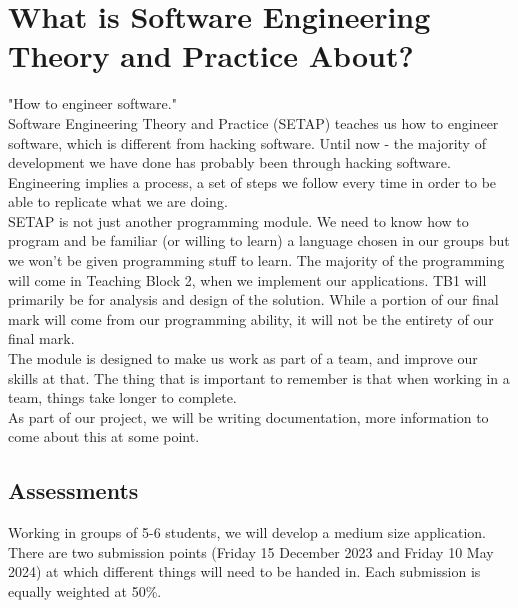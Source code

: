 
\section{What is Software Engineering Theory and Practice About?}
"How to engineer software."\\

Software Engineering Theory and Practice (SETAP) teaches us how to engineer software, which is different from hacking software. Until now - the majority of development we have done has probably been through hacking software. Engineering implies a process, a set of steps we follow every time in order to be able to replicate what we are doing.\\

SETAP is not just another programming module. We need to know how to program and be familiar (or willing to learn) a language chosen in our groups but we won't be given programming stuff to learn. The majority of the programming will come in Teaching Block 2, when we implement our applications. TB1 will primarily be for analysis and design of the solution. While a portion of our final mark will come from our programming ability, it will not be the entirety of our final mark.\\

The module is designed to make us work as part of a team, and improve our skills at that. The thing that is important to remember is that when working in a team, things take longer to complete.\\

As part of our project, we will be writing documentation, more information to come about this at some point.

\subsection{Assessments}
Working in groups of 5-6 students, we will develop a medium size application. There are two submission points (Friday 15 December 2023 and Friday 10 May 2024) at which different things will need to be handed in. Each submission is equally weighted at 50\%.

